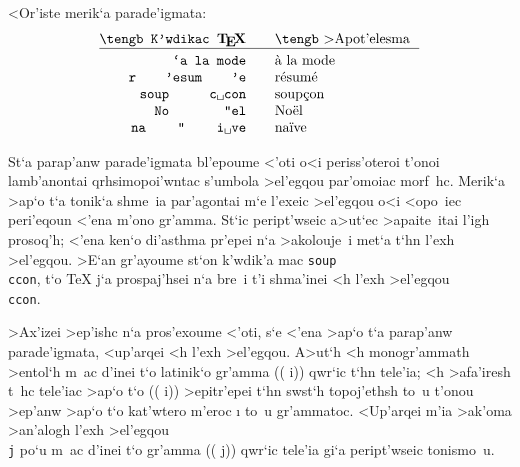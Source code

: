 <Or'iste merik`a parade'igmata:
$$\vbox{

\halign{
\strut \hfil\tt # & \quad\rm # \hfil\cr
\tengb K'wdikac {\bf \TeX} & \tengb >Apot'elesma \cr
\noalign{\hrule} \noalign{\smallskip}
\\`a la mode          & \`a la mode \cr
r\\'esum\\'e          & r\'esum\'e  \cr
soup\\c{\sp}con       & soup\c con  \cr
No\\"el               & No\"el      \cr
na\\"\\i{\sp}ve       & na\"\i ve   \cr
}
}$$

St`a parap'anw parade'igmata bl'epoume <'oti o<i periss'oteroi t'onoi   
lamb'anontai qrhsimopoi'wntac s'umbola >el'egqou par'omoiac morf~hc. 
Merik`a >ap`o t`a tonik`a shme~ia par'agontai m`e l'exeic >el'egqou o<i 
<opo~iec peri'eqoun <'ena m'ono gr'amma.  St`ic peript'wseic a>ut`ec
>apaite~itai l'igh prosoq'h; <'ena ken`o di'asthma pr'epei n`a
>akolouje~i met`a t`hn l'exh >el'egqou.  >E`an gr'a\-you\-me st`on
k'wdik'a mac {\tt soup\\ccon}, t`o {\rm \TeX} j`a prospaj'hsei n`a bre~i
t'i shma'inei <h l'exh >el'egqou {\tt\\ccon}.

>Ax'izei >ep'ishc n`a pros'exoume <'oti, s`e <'ena >ap`o t`a parap'anw
parade'igmata, <up'arqei <h l'exh >el'eg\-qou\NB{\tt \\i}.  A>ut`h <h
mono\-gr'am\-math >entol`h m~ac d'inei t`o lati\-nik`o gr'amma (({\rm
i})) qwr`ic t`hn tele'ia; <h >afa'iresh t~hc tele'iac >ap`o t`o (({\rm
i})) >epitr'epei t`hn swst`h topo\-j'ethsh to~u t'onou >ep'anw >ap`o t`o
kat'wtero m'eroc {\rm \i} to~u gr'am\-matoc.  <Up'arqei m'ia >ak'oma
>an'alogh l'exh >el'egqou {\tt\\j} po`u m~ac d'i\-nei t`o gr'amma (({\rm
j})) qwr`ic tele'ia gi`a peript'wseic tonismo~u.

